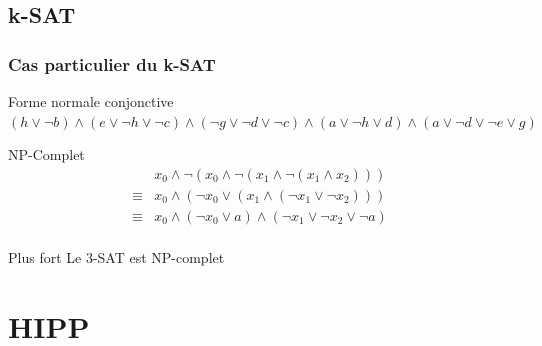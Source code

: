 \documentclass{beamer}
\begin{document}
\subsection{k-SAT}
\begin{frame}
    \frametitle{Cas particulier du k-SAT}
    \begin{exampleblock}{Forme normale conjonctive}
        $(h\vee\neg b) \wedge (e\vee\neg h\vee\neg c) \wedge (\neg g\vee\neg d\vee\neg c) \wedge (a\vee\neg h\vee d) \wedge (a\vee\neg d\vee\neg e\vee g)$
    \end{exampleblock}
    \begin{block}{NP-Complet}
        \[ \begin{array}{cl}
                & x_0 \wedge \neg(x_0 \wedge \neg(x_1 \wedge \neg (x_1 \wedge x_2))) \\
                \equiv & x_0 \wedge (\neg x_0 \vee (x_1 \wedge (\neg x_1 \vee \neg x_2))) \\
                \equiv & x_0 \wedge (\neg x_0 \vee a) \wedge (\neg x_1 \vee \neg x_2 \vee \neg a) \\
           \end{array}
        \]
    \end{block}
    \begin{alertblock}{Plus fort}
        Le 3-SAT est NP-complet
    \end{alertblock}
\end{frame}

\section{HIPP}
\end{document}
